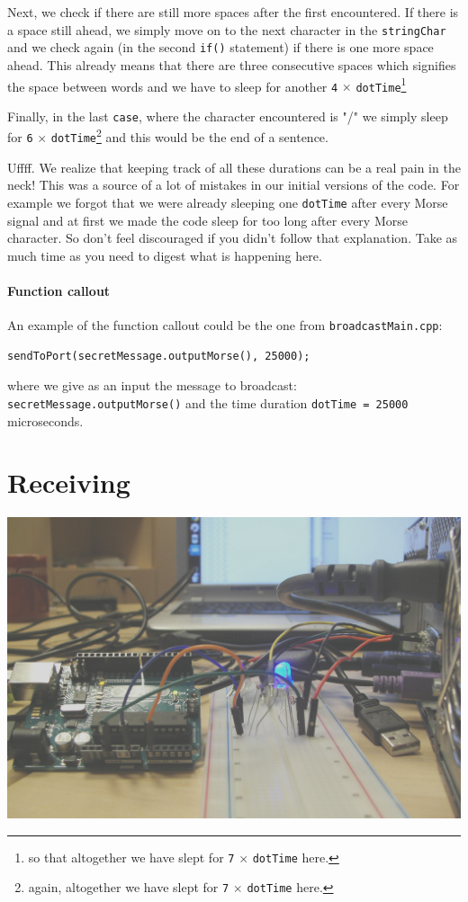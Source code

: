 \documentclass[12pt]{report}
\begin{document}
Next, we check if there are still more spaces after the first encountered. If there is a space still ahead, we simply move on to the next character in the \texttt{stringChar} and we check again (in the second \texttt{if()} statement) if there is one more space ahead. This already means that there are three consecutive spaces which signifies the space between words and we have to sleep for another \verb|4| $\times$ \verb|dotTime|\footnote{so that altogether we have slept for \texttt{7} $\times$ \texttt{dotTime} here.}

Finally, in the last \texttt{case}, where the character encountered is "/" we simply sleep for \verb|6| $\times$ \verb|dotTime|\footnote{again, altogether we have slept for \texttt{7} $\times$ \texttt{dotTime} here.} and this would be the end of a sentence.

Uffff. We realize that keeping track of all these durations can be a real pain in the neck! This was a source of a lot of mistakes in our initial versions of the code. For example we forgot that we were already sleeping one \verb|dotTime| after every Morse signal and at first we made the code sleep for too long after every Morse character. So don't feel discouraged if you didn't follow that explanation. Take as much time as you need to digest what is happening here.

\subsubsection{Function callout}

An example of the function callout could be the one from \texttt{broadcastMain.cpp}:

\begin{lstlisting}
sendToPort(secretMessage.outputMorse(), 25000);
\end{lstlisting}

where we give as an input the message to broadcast: \texttt{secretMessage.outputMorse()} and the time duration \texttt{dotTime = 25000} microseconds.

\newpage

\chapter{Receiving}

\includegraphics[width = 145mm]{working_1.jpg}
\end{document}
